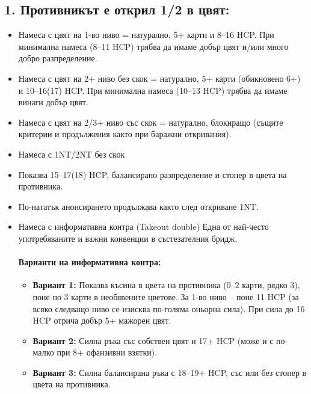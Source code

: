 \documentclass[10pt,a5paper]{extarticle}
\begin{document}
\subsection*{1. Противникът е открил 1/2 в цвят:}
\begin{itemize}
  \item[] Намеса с цвят на 1-во ниво = натурално, 5+ карти и 8--16 HCP.  
  При минимална намеса (8--11 HCP) трябва да имаме добър цвят и/или много добро разпределение.
  \item[] Намеса с цвят на 2+ ниво без скок = натурално, 5+ карти (обикновено 6+) и 10--16(17) HCP.  
  При минимална намеса (10--13 HCP) трябва да имаме винаги добър цвят.
  \item[] Намеса с цвят на 2/3+ ниво със скок = натурално, блокиращо (същите критерии и продължения както при баражни откривания).  
    \item[]  Намеса с 1NT/2NT без скок
  \item[] Показва 15--17(18) HCP, балансирано разпределение и стопер в цвета на противника.  
  \item[] По-нататък анонсирането продължава както след откриване 1NT.  
    \item[] Намеса с информативна контра (Takeout double)
Една от най-често употребяваните и важни конвенции в състезателния бридж.  
\paragraph{Варианти на информативна контра:}
\begin{itemize}
  \item[] \textbf{Вариант 1:} Показва късина в цвета на противника (0--2 карти, рядко 3), поне по 3 карти в необявените цветове.  
  За 1-во ниво -- поне 11 HCP (за всяко следващо ниво се изисква по-голяма оньорна сила).  
  При сила до 16 HCP отрича добър 5+ мажорен цвят.  

  \item[] \textbf{Вариант 2:} Силна ръка със собствен цвят и 17+ HCP (може и с по-малко при 8+ офанзивни взятки).  

  \item[] \textbf{Вариант 3:} Силна балансирана ръка с 18--19+ HCP, със или без стопер в цвета на противника.  
\end{itemize}

\end{itemize}
\end{document}
